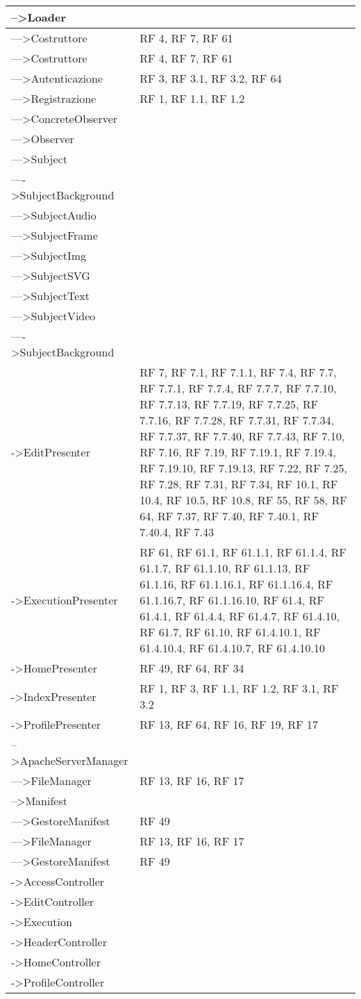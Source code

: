 {\begin{longtable} [c]{| p{8cm} | p{5cm} |}
 \hline 
-->Loader & \\ 
 \hline 
--->Costruttore & RF 4, RF 7, RF 61\\ 
 \hline 
--->Costruttore & RF 4, RF 7, RF 61\\ 
 \hline 
--->Autenticazione & RF 3, RF 3.1, RF 3.2, RF 64\\ 
 \hline 
--->Registrazione & RF 1, RF 1.1, RF 1.2\\ 
 \hline 
--->ConcreteObserver & \\ 
 \hline 
--->Observer & \\ 
 \hline 
--->Subject & \\ 
 \hline 
---->SubjectBackground & \\ 
 \hline 
--->SubjectAudio & \\ 
 \hline 
--->SubjectFrame & \\ 
 \hline 
--->SubjectImg & \\ 
 \hline 
--->SubjectSVG & \\ 
 \hline 
--->SubjectText & \\ 
 \hline 
--->SubjectVideo & \\ 
 \hline 
---->SubjectBackground & \\ 
 \hline 
->EditPresenter & RF 7, RF 7.1, RF 7.1.1, RF 7.4, RF 7.7, RF 7.7.1, RF 7.7.4, RF 7.7.7, RF 7.7.10, RF 7.7.13, RF 7.7.19, RF 7.7.25, RF 7.7.16, RF 7.7.28, RF 7.7.31, RF 7.7.34, RF 7.7.37, RF 7.7.40, RF 7.7.43, RF 7.10, RF 7.16, RF 7.19, RF 7.19.1, RF 7.19.4, RF 7.19.10, RF 7.19.13, RF 7.22, RF 7.25, RF 7.28, RF 7.31, RF 7.34, RF 10.1, RF 10.4, RF 10.5, RF 10.8, RF 55, RF 58, RF 64, RF 7.37, RF 7.40, RF 7.40.1, RF 7.40.4, RF 7.43\\ 
 \hline 
->ExecutionPresenter & RF 61, RF 61.1, RF 61.1.1, RF 61.1.4, RF 61.1.7, RF 61.1.10, RF 61.1.13, RF 61.1.16, RF 61.1.16.1, RF 61.1.16.4, RF 61.1.16.7, RF 61.1.16.10, RF 61.4, RF 61.4.1, RF 61.4.4, RF 61.4.7, RF 61.4.10, RF 61.7, RF 61.10, RF 61.4.10.1, RF 61.4.10.4, RF 61.4.10.7, RF 61.4.10.10\\ 
 \hline 
->HomePresenter & RF 49, RF 64, RF 34\\ 
 \hline 
->IndexPresenter & RF 1, RF 3, RF 1.1, RF 1.2, RF 3.1, RF 3.2\\ 
 \hline 
->ProfilePresenter & RF 13, RF 64, RF 16, RF 19, RF 17\\ 
 \hline 
-->ApacheServerManager & \\ 
 \hline 
--->FileManager & RF 13, RF 16, RF 17\\ 
 \hline 
-->Manifest & \\ 
 \hline 
--->GestoreManifest & RF 49\\ 
 \hline 
--->FileManager & RF 13, RF 16, RF 17\\ 
 \hline 
--->GestoreManifest & RF 49\\ 
 \hline 
->AccessController & \\ 
 \hline 
->EditController & \\ 
 \hline 
->Execution & \\ 
 \hline 
->HeaderController & \\ 
 \hline 
->HomeController & \\ 
 \hline 
->ProfileController & \\ 
 \hline 
\end{longtable}}